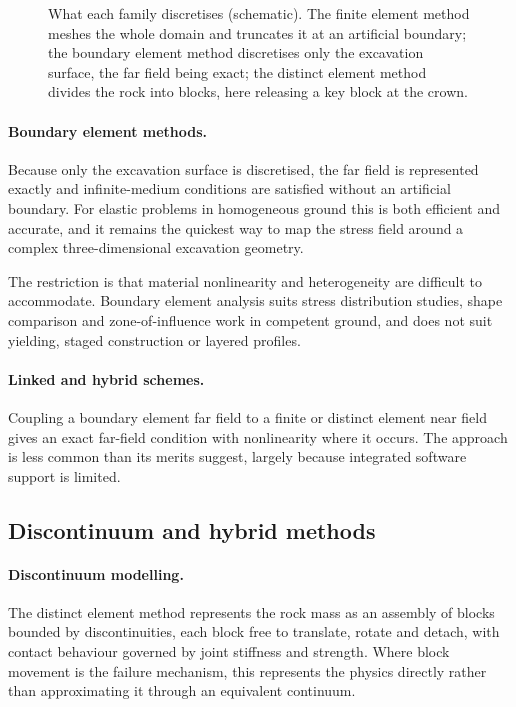 \begin{figure}[htbp]
\centering
{}
\caption{What each family discretises (schematic). The finite element method meshes the whole domain and truncates it at an artificial boundary; the boundary element method discretises only the excavation surface, the far field being exact; the distinct element method divides the rock into blocks, here releasing a key block at the crown.}
\label{fig:method-family}
\end{figure}

\paragraph{Boundary element methods.}
Because only the excavation surface is discretised, the far field is
represented exactly and infinite-medium conditions are satisfied without an
artificial boundary. For elastic problems in homogeneous ground this is both
efficient and accurate, and it remains the quickest way to map the stress
field around a complex three-dimensional excavation geometry.

The restriction is that material nonlinearity and heterogeneity are difficult
to accommodate. Boundary element analysis suits stress distribution studies,
shape comparison and zone-of-influence work in competent ground, and does not
suit yielding, staged construction or layered profiles.

\paragraph{Linked and hybrid schemes.}
Coupling a boundary element far field to a finite or distinct element near
field gives an exact far-field condition with nonlinearity where it occurs.
The approach is less common than its merits suggest, largely
because integrated software support is limited.

\subsection{Discontinuum and hybrid methods}
\label{sec:discontinuum-hybrid}

\paragraph{Discontinuum modelling.}
The distinct element method represents the rock mass as an assembly of blocks
bounded by discontinuities, each block free to translate, rotate and detach,
with contact behaviour governed by joint stiffness and strength. Where block
movement is the failure mechanism, this represents the physics directly rather
than approximating it through an equivalent continuum.

